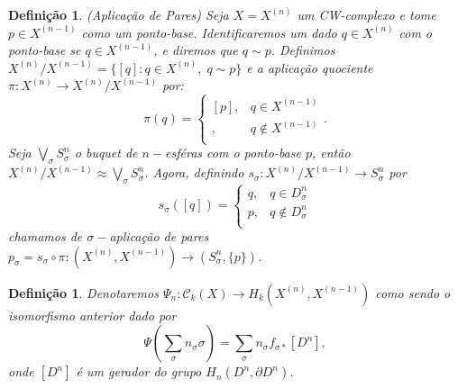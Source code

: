 \documentclass[12pt]{book}
\newtheorem{definicao}[teorema]{Definição}
\newcommand{\celula}[2]{D^{#1}_{#2}}
\newcommand{\classe}[1]{[#1]}
\newcommand{\funcaocond}[5]{
	#1 = 
	\left\{
	\begin{array}{cc}
		#2, & #3\\
		#4, & #5\\
	\end{array}
	\right.
}
\newcommand{\homologiarelcel}[3]{H_{#1}(D^{#2}_{#3}, \partial D^{#2}_{#3})}
\newcommand{\homologiarelskelesimpl}[2]{H_{#1}(X^{(#2)}, X^{(#2-1)})}
\newcommand{\skeleton}[1]{X^{(#1)}}
\begin{document}
	\begin{definicao}
		(Aplicação de Pares) Seja $X = \skeleton{n}$ um CW-complexo e tome $p \in \skeleton{n-1}$ como um ponto-base. Identificaremos um dado $q \in \skeleton{n}$ com o ponto-base se $q \in \skeleton{n-1}$, e diremos que $q \sim p$. Definimos $\skeleton{n}/\skeleton{n-1} = \{[q]: q \in \skeleton{n}, \; q \sim p\}$ e a aplicação quociente $\pi : \skeleton{n} \to \skeleton{n}/\skeleton{n-1}$ por:
		$$
		\pi(q) = 
		\left\{
		\begin{array}{cc}
		\classe{p}, & q \in \skeleton{n-1}\\
		\classe{q}, & q \notin \skeleton{n-1}\\
		\end{array}
		\right..
		$$
		Seja $\bigvee_{\sigma} S^{n}_{\sigma}$ o buquet de $n-$esféras com o ponto-base $p$, então $\skeleton{n}/\skeleton{n-1} \approx \bigvee_{\sigma} S^{n}_{\sigma}$. Agora, definindo $s_{\sigma} : \skeleton{n}/\skeleton{n-1} \to S^{n}_{\sigma}$ por 
		$$
		\funcaocond{s_{\sigma}([q])}{q}{q \in \celula{n}{\sigma}}{p}{q \notin \celula{n}{\sigma}}
		$$
		chamamos de $\sigma-$aplicação de pares $p_{\sigma} = s_{\sigma} \circ \pi : (\skeleton{n}, \skeleton{n-1}) \to (S^{n}_{\sigma}, \{p\})$.
	\end{definicao}
	
	\begin{definicao}
		Denotaremos $\Psi_{n}:\mathcal{C}_{k}(X) \to \homologiarelskelesimpl{k}{n}$ como sendo o isomorfismo anterior dado por 
		$$
		\Psi(\sum_{\sigma} n_{\sigma} \sigma) = \sum_{\sigma} n_{\sigma} f_{\sigma *}[D^{n}],
		$$
		onde $[D^{n}]$ é um gerador do grupo $\homologiarelcel{n}{n}{}$.
	\end{definicao}
	
\end{document}
